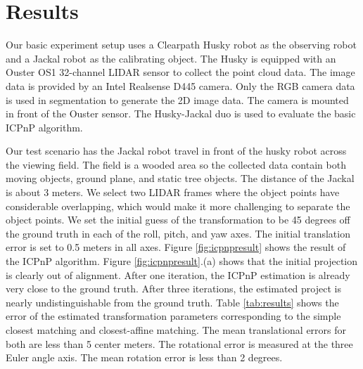 \documentclass{article}
\begin{document}
\section{Results}
Our basic experiment setup uses a Clearpath Husky robot as the observing robot and a Jackal robot as the calibrating object. The Husky is equipped with an Ouster OS1 32-channel LIDAR sensor to collect the point cloud data. The image data is provided by an Intel Realsense D445 camera. Only the RGB camera data is used in segmentation to generate the 2D image data. The camera is mounted in front of the Ouster sensor. The Husky-Jackal duo is used to evaluate the basic ICPnP algorithm.

Our test scenario has the Jackal robot travel in front of the husky robot across the viewing field. The field is a wooded area so the collected data contain both moving objects, ground plane, and static tree objects. The distance of the Jackal is about 3 meters. We select two LIDAR frames where the object points have considerable overlapping, which would make it more challenging to separate the object points. We set the initial guess of the transformation to be 45 degrees off the ground truth in each of the roll, pitch, and yaw axes. The initial translation error is set to 0.5 meters in all axes. Figure \ref{fig:icpnpresult} shows the result of the ICPnP algorithm. Figure \ref{fig:icpnpresult}.(a) shows that the initial projection is clearly out of alignment. After one iteration, the ICPnP estimation is already very close to the ground truth. After three iterations, the estimated project is nearly undistinguishable from the ground truth. Table \ref{tab:results} shows the error of the estimated transformation parameters corresponding to the simple closest matching and closest-affine matching. The mean translational errors for both are less than 5 center meters. The rotational error is measured at the three  Euler angle axis. The mean rotation error is less than 2 degrees. 
\end{document}
